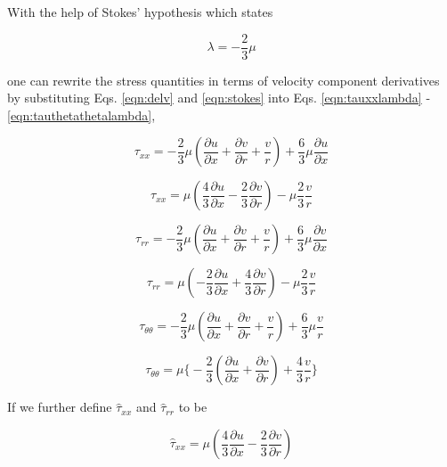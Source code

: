 	With the help of Stokes' hypothesis which states

\begin{equation}
	\lambda = -\frac{2}{3} \mu
\label{eqn:stokes}
\end{equation}

	one can rewrite the stress quantities in terms of velocity component derivatives by substituting Eqs. \ref{eqn:delv} and
\ref{eqn:stokes} into Eqs. \ref{eqn:tauxxlambda} - \ref{eqn:tauthetathetalambda},

\begin{displaymath}
	\tau_{xx} = - \frac{2}{3} \mu (\frac{\partial u}{\partial x} + \frac{\partial v}{\partial r} + \frac{v}{r}) 
	+ \frac{6}{3} \mu \frac{\partial u}{\partial x}
\end{displaymath}

\begin{displaymath}
	\tau_{xx} = \mu ( \frac{4}{3} \frac{\partial u}{\partial x} - \frac{2}{3} \frac{\partial v}{\partial r})  
	- \mu \frac{2}{3} \frac{v}{r} 
\end{displaymath}

\begin{displaymath}
	\tau_{rr} = - \frac{2}{3} \mu (\frac{\partial u}{\partial x} + \frac{\partial v}{\partial r} + \frac{v}{r}) 
	+ \frac{6}{3} \mu \frac{\partial v}{\partial x}
\end{displaymath}

\begin{displaymath}
	\tau_{rr} = \mu ( - \frac{2}{3} \frac{\partial u}{\partial x} + \frac{4}{3} \frac{\partial v}{\partial r})  
	- \mu \frac{2}{3} \frac{v}{r} 
\end{displaymath}

\begin{displaymath}
	\tau_{\theta \theta} = - \frac{2}{3} \mu (\frac{\partial u}{\partial x} + \frac{\partial v}{\partial r} 
	+ \frac{v}{r}) + \frac{6}{3}\mu \frac{v}{r}
\end{displaymath}

\begin{equation}
	\tau_{\theta \theta} = \mu \Big\{- \frac{2}{3} (\frac{\partial u}{\partial x} + \frac{\partial v}{\partial r})  
	+ \frac{4}{3} \frac{v}{r} \Big\} 
\label{eqn:tauthetatheta}
\end{equation}

	If we further define $\hat{\tau}_{xx}$ and $\hat{\tau}_{rr}$ to be 

\begin{equation}
	\hat{\tau}_{xx} =  \mu ( \frac{4}{3} \frac{\partial u}{\partial x} - \frac{2}{3} \frac{\partial v}{\partial r})  
\label{eqn:tauxxhat}
\end{equation}

